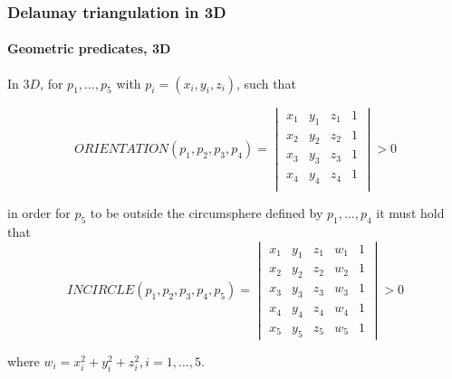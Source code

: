 \documentclass[c, 10pt]{beamer}
\begin{document}
\begin{frame}\frametitle{Delaunay triangulation in 3D}\framesubtitle{Geometric predicates, 3D}

In $3D$, for $p_1, \dots, p_5$  with $p_i = ( x_i, y_i, z_i)$, such that

$$ORIENTATION(p_1,p_2,p_3,p_4) = 
\begin{vmatrix} 
x_1 & y_1 & z_1 & 1 \\
x_2 & y_2 & z_2 & 1 \\
x_3 & y_3 & z_3 & 1 \\
x_4 & y_4 & z_4 & 1 \\
\end{vmatrix} > 0$$

in order for $p_5$ to be outside the circumsphere defined by $p_1,\dots,p_4$ it must hold that
$$INCIRCLE(p_1,p_2,p_3,p_4, p_5) = \begin{vmatrix} x_1 & y_1 & z_1 & w_1 & 1 \\
x_2 & y_2 & z_2 & w_2 & 1 \\
x_3 & y_3 & z_3 & w_3 & 1 \\
x_4 & y_4 & z_4 & w_4 & 1 \\
x_5 & y_5 & z_5 & w_5 & 1\end{vmatrix} > 0$$

where $w_i = x_i^2  + y_i^2 + z_i^2, i = 1,\dots, 5$.


\end{frame}
\end{document}
